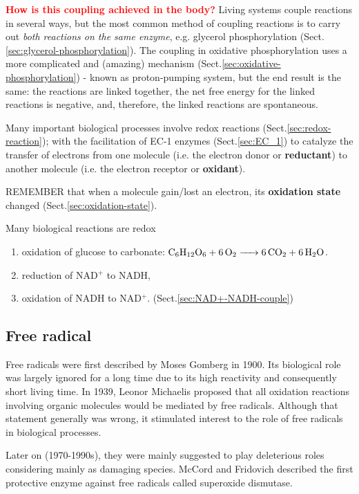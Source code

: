 \textcolor{red}{\bf How is this coupling achieved in the body?}
Living systems couple reactions in several ways, but the most common method of
coupling reactions is to carry out {\it both reactions on the same enzyme}, e.g.
glycerol phosphorylation (Sect.\ref{sec:glycerol-phosphorylation}).
The coupling in oxidative phosphorylation uses a more complicated and (amazing)
mechanism (Sect.\ref{sec:oxidative-phosphorylation}) - known as proton-pumping
system, but the end result is the same: the reactions are linked together, the
net free energy for the linked reactions is negative, and, therefore, the linked
reactions are spontaneous.


Many important biological processes involve redox reactions
(Sect.\ref{sec:redox-reaction}); with the facilitation of EC-1 enzymes
(Sect.\ref{sec:EC_1}) to catalyze the transfer of electrons from one molecule
(i.e. the electron donor or {\bf reductant}) to another molecule (i.e. the
electron receptor or {\bf oxidant}).

REMEMBER that when a molecule gain/lost an electron, its {\bf oxidation
state} changed (Sect.\ref{sec:oxidation-state}).

Many biological reactions are redox
\begin{enumerate}

  \item oxidation of glucose to carbonate: $\ce{C6H12O6 + 6O2 -> 6 CO2 + 6H2O}$.

  \item reduction of NAD$^+$ to NADH,

  \item oxidation of NADH to NAD$^+$.
  (Sect.\ref{sec:NAD+-NADH-couple})

\end{enumerate}

\subsection{Free radical}
\label{sec:free-radical}

Free radicals were first described by Moses Gomberg in 1900. Its biological role
was largely ignored for a long time due to its high reactivity and consequently
short living time. In 1939, Leonor Michaelis proposed that all oxidation
reactions involving organic molecules would be mediated by free radicals.
Although that statement generally was wrong, it stimulated interest to the role
of free radicals in biological processes.

Later on (1970-1990s), they were mainly suggested to play deleterious roles
considering mainly as damaging species.
McCord and Fridovich described the first protective enzyme against free radicals
called superoxide dismutase.

